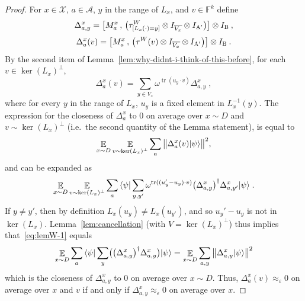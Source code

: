 \documentclass[11pt]{article}
\theoremstyle{definition}
\newcommand{\ket}[1]{|#1\rangle}
\newcommand{\bra}[1]{\langle#1|}
\newcommand{\Id}{\ensuremath{I}}
\newcommand{\F}{\ensuremath{\mathbb{F}}}
\newcommand{\eps}{\varepsilon}
\DeclareMathOperator{\tr}{tr}
\newcommand{\E}{\mathop{\mathbb{E}}\displaylimits} %
\newcommand{\labelstyle}[1]{\ensuremath{\textsc{#1}}\xspace}
\newcommand{\alice}{\labelstyle{A}}
\newcommand{\bob}{\labelstyle{B}}
\renewcommand{\cal}[1]{\mathcal{#1}}
\begin{document}
\begin{proof}
  For $x\in \cal{X}$, $a\in \cal{A}$, $y$ in the range of $L_x$, and $v\in \F^k$
  define
  \begin{equation*}
    \Delta^x_{a,y} = \big[ M^x_a \,,\, \big(\tau^W_{[L_x(\cdot)=y]} \otimes
    \Id_{\overline{V_x}} \otimes \Id_{\alice'}\big) \big]\otimes \Id_\bob\:,
  \end{equation*}
  \begin{equation*}
    \Delta^x_a(v) = \big[ M^x_a \,,\, \big( \tau^W(v) \otimes
    \Id_{\overline{V_x}} \otimes \Id_{\alice'} \big) \big]  \otimes \Id_\bob\:.
  \end{equation*}
  By the second item of Lemma~\ref{lem:why-didnt-i-think-of-this-before}, for
  each $v \in \ker(L_x)^\perp$,
  \begin{equation*}
    \Delta^x_a(v) = \sum_{y \in V_x} \omega^{\tr(u_y \cdot v)} \Delta^x_{a,y}\;,
  \end{equation*}
	where for every $y$ in the range of $L_x$, $u_y$ is a fixed element in
  $L_x^{-1}(y)$.
  The expression for the closeness of $\Delta^x_a$ to $0$ on average over $x
  \sim D$ and $v \sim \ker(L_x)^\perp$ (i.e.\ the second quantity of the Lemma
  statement), is equal to
  \begin{equation*}
    \E_{x\sim D} \E_{v \sim \ker(L_x)^\perp} \sum_a\, \bigl \| \Delta^x_a (v)
  \ket{\psi}\bigr \|^2,
  \end{equation*}
  and can be expanded as
  \begin{equation}\label{eq:lemW-1}
    \E_{x\sim D} \E_{v \sim \ker(L_x)^\perp} \sum_a\, \bra{\psi} \sum_{y,y'}
    \omega^{\tr ((u_y'-u_y) \cdot v)} \bigl( \Delta^x_{a,y} \bigr)^\dagger
    \Delta^x_{a,y'} \ket{\psi}\;.
  \end{equation}
  If $y \neq y'$, then by definition $L_x(u_y) \neq L_x(u_{y'})$, and so $u_y' -
  u_y$ is not in $\ker(L_x)$.
  Lemma~\ref{lem:cancellation} (with $V = \ker(L_x)^\perp$) thus implies
  that~\eqref{eq:lemW-1} equals
  \begin{equation*}
    \E_{x\sim D} \sum_a\, \bra{\psi} \sum_{y} \bigl( \bigl( \Delta^x_{a,y}
    \bigr)^\dagger \Delta^x_{a,y} \bigr) \ket{\psi} = \E_{x\sim D} \sum_{a, y}
    \, \bigl \|\Delta^x_{a,y} \ket{\psi} \bigr \|^2
  \end{equation*}
  which is the closeness of $\Delta^x_{a,y}$ to $0$ on average over $x \sim D$.
  Thus, $\Delta^x_a(v) \approx_\eps 0$ on average over $x$ and $v$ if and only
  if $\Delta^x_{a,y} \approx_\eps 0$ on average over $x$.
\end{proof}
\end{document}
